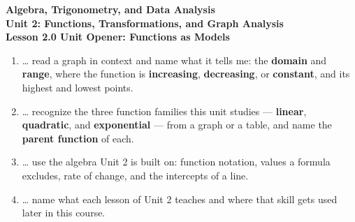 \documentclass[10pt]{article}
\begin{document}
\vspace{-0.8in}

\begin{center}
  {\color{white}\textbf{\LARGE Algebra, Trigonometry, and Data Analysis}}\\[4pt]
  {\color{mistmid}\large\textbf{Unit 2: Functions, Transformations, and Graph Analysis}}\\[6pt]
  {\color{white}\textbf{\large Lesson 2.0 \quad Unit Opener: Functions as Models}}
\end{center}

\vspace{0.22in}
\namedateperiod
\vspace{0.18in}

\begin{learningtargetbox}
\small
\begin{enumerate}[leftmargin=1.5em, itemsep=5pt]
  \item \ldots{} read a graph in context and name what it tells me: the \textbf{domain} and
        \textbf{range}, where the function is \textbf{increasing}, \textbf{decreasing}, or
        \textbf{constant}, and its highest and lowest points.
  \item \ldots{} recognize the three function families this unit studies --- \textbf{linear},
        \textbf{quadratic}, and \textbf{exponential} --- from a graph or a table, and name the
        \textbf{parent function} of each.
  \item \ldots{} use the algebra Unit 2 is built on: function notation, values a formula excludes,
        rate of change, and the intercepts of a line.
  \item \ldots{} name what each lesson of Unit 2 teaches and where that skill gets used later in
        this course.
\end{enumerate}
\end{learningtargetbox}

\vspace{0.14in}
\end{document}
